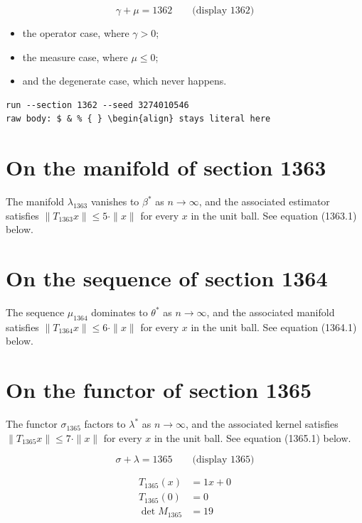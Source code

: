 \documentclass{article}
\begin{document}
$$
\gamma + \mu = 1362 \qquad \text{(display 1362)}
$$

\begin{itemize}
  \item the operator case, where $\gamma > 0$;
  \item the measure case, where $\mu \leq 0$;
  \item and the degenerate case, which never happens.
\end{itemize}

\begin{verbatim}
run --section 1362 --seed 3274010546
raw body: $ & % { } \begin{align} stays literal here
\end{verbatim}

\section{On the manifold of section 1363}
The manifold $\lambda_{1363}$ vanishes to $\beta^{*}$ as $n \to \infty$,
and the associated estimator satisfies $\|T_{1363} x\| \leq 5 \cdot \|x\|$
for every $x$ in the unit ball. See equation (1363.1) below.

\section{On the sequence of section 1364}
The sequence $\mu_{1364}$ dominates to $\theta^{*}$ as $n \to \infty$,
and the associated manifold satisfies $\|T_{1364} x\| \leq 6 \cdot \|x\|$
for every $x$ in the unit ball. See equation (1364.1) below.

\section{On the functor of section 1365}
The functor $\sigma_{1365}$ factors to $\lambda^{*}$ as $n \to \infty$,
and the associated kernel satisfies $\|T_{1365} x\| \leq 7 \cdot \|x\|$
for every $x$ in the unit ball. See equation (1365.1) below.

$$
\sigma + \lambda = 1365 \qquad \text{(display 1365)}
$$

\begin{align}
T_{1365}(x) &= 1 x + 0 \\
T_{1365}(0) &= 0 \\
\det M_{1365} &= 19
\end{align}
\end{document}
